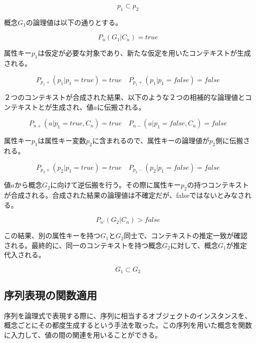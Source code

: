 \documentclass[12pt]{article}
\begin{document}
\begin{equation} p_1 \subset p_2 \end{equation}

概念\(G_1\)の論理値は以下の通りとする。

\begin{equation}  P_n(G_1|C_n) =true\end{equation}

属性キー\(p_1\)は仮定が必要な対象であり、新たな仮定を用いたコンテキストが生成される。

\begin{equation} P_{p_{1}+}(p_1|p_1=true)=true \quad P_{p_{1}+}(p_1|p_1=false)=false \end{equation}

２つのコンテキストが合成された結果、以下のような２つの相補的な論理値とコンテキストとが生成され、値\(a\)に伝搬される。

\begin{equation} P_{n+}(a|p_1=true,C_n)=true \quad P_{n-}(a|p_1=false,C_n)=false \end{equation}

属性キー\(p_1\)は属性キー変数\(p_2\)に含まれるので、属性キーの論理値が\(p_2\)側に伝搬される。

\begin{equation} P_{p_{2}+}(p_2|p_1=true)=true \quad  P_{p_{2}-}(p_2|p_1=false)=false \end{equation}

値\(a\)から概念\(G_2\)に向けて逆伝搬を行う。その際に属性キー\(p_2\)の持つコンテキストが合成される。合成された結果の論理値は不確定だが、falseではないとみなされる。

\begin{equation}  P_{n'}(G_2|C_n) > false\end{equation}

この結果、別の属性キーを持つ\(G_1\)と\(G_2\)同士で、コンテキストの推定一致が確認される。最終的に、同一のコンテキストを持つ概念\(G_2\)に対して、概念\(G_1\)が推定代入される。

\begin{equation} G_1 \subset G_2\end{equation}

\subsection{序列表現の関数適用}\label{ux5e8fux5217ux8868ux73feux306eux95a2ux6570ux9069ux7528}

序列を論理式で表現する際に、序列に相当するオブジェクトのインスタンスを、概念ごとにその都度生成するという手法を取った。この序列を用いた概念を関数に入力して、値の間の関連を用いることができる。
\end{document}
